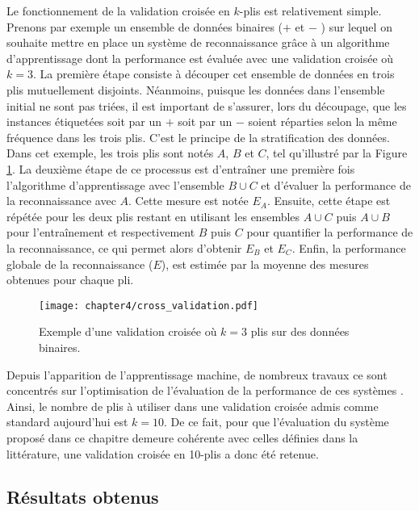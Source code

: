 Le fonctionnement de la validation croisée en $k$-plis est relativement simple. Prenons par exemple un ensemble de données binaires (\og $+$ \fg et \og $-$ \fg) sur lequel on souhaite mettre en place un système de reconnaissance grâce à un algorithme d'apprentissage dont la performance est évaluée avec une validation croisée où $k=3$. La première étape consiste à découper cet ensemble de données en trois plis mutuellement disjoints. Néanmoins, puisque les données dans l'ensemble initial ne sont pas triées, il est important de s'assurer, lors du découpage, que les instances étiquetées soit par un \og $+$ \fg soit par un \og $-$ \fg soient réparties selon la même fréquence dans les trois plis. C'est le principe de la stratification des données. Dans cet exemple, les trois plis sont notés $A$, $B$ et $C$, tel qu'illustré par la Figure \ref{fig:cross_validation}. La deuxième étape de ce processus est d'entraîner une première fois l'algorithme d'apprentissage avec l'ensemble $B\cup C$ et d'évaluer la performance de la reconnaissance avec $A$. Cette mesure est notée $E_A$. Ensuite, cette étape est répétée pour les deux plis restant en utilisant les ensembles $A\cup C$ puis $A\cup B$ pour l'entraînement et respectivement $B$ puis $C$ pour quantifier la performance de la reconnaissance, ce qui permet alors d'obtenir $E_B$ et $E_C$. Enfin, la performance globale de la reconnaissance ($E$), est estimée par la moyenne des mesures obtenues pour chaque pli.

\begin{figure}[H]
	\centering
	\texttt{[image: chapter4/cross\_validation.pdf]}
        \caption{Exemple d'une validation croisée où $k=3$ plis sur des données binaires.}
	\label{fig:cross_validation}
\end{figure}

Depuis l'apparition de l'apprentissage machine, de nombreux travaux ce sont concentrés sur l'optimisation de l'évaluation de la performance de ces systèmes \citep{Witten2016}. Ainsi, le nombre de plis à utiliser dans une validation croisée admis comme standard aujourd'hui est $k=10$. De ce fait, pour que l'évaluation du système proposé dans ce chapitre demeure cohérente avec celles définies dans la littérature, une validation croisée en 10-plis a donc été retenue.

\subsection{Résultats obtenus}


